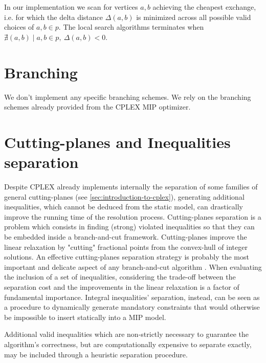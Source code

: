 In our implementation
we scan for vertices $a, b$ achieving the cheapest exchange,
i.e. for which the delta distance $\Delta(a, b)$ is minimized across all possible valid choices of $a, b \in p$.
The local search algorithms terminates when $\nexists (a, b) \mid a, b \in p,\ \Delta(a, b) < 0$.

\section{Branching}
\label{sec:impl-branching}


We don't implement any specific branching schemes.
We rely on the branching schemes already provided from the CPLEX MIP optimizer.

\section{Cutting-planes and Inequalities separation}
\label{sec:impl-separation-techniques}

Despite CPLEX already implements internally
the separation of some families of general cutting-planes
(see \cref{sec:introduction-to-cplex}),
generating additional inequalities,
which cannot be deduced from the static model,
can drastically improve the running time of the resolution process.
Cutting-planes separation is a problem which consists
in finding (strong) violated inequalities
so that they can be embedded inside a branch-and-cut framework.
Cutting-planes improve the linear relaxation
by "cutting" fractional points from the convex-hull of integer solutions.
An effective cutting-planes separation strategy
is probably the most important and delicate aspect of any branch-and-cut algorithm \parencite{ralphs2003}.
When evaluating the inclusion of a set of inequalities,
considering the trade-off between the separation cost
and the improvements in the linear relaxation
is a factor of fundamental importance.
Integral inequalities' separation, instead, can be seen as a procedure
to dynamically generate mandatory constraints
that would otherwise be impossible to insert statically into a MIP model.

Additional valid inequalities which are non-strictly necessary to guarantee the algorithm's correctness,
but are computationally expensive to separate exactly,
may be included through a heuristic separation procedure.

\medskip

